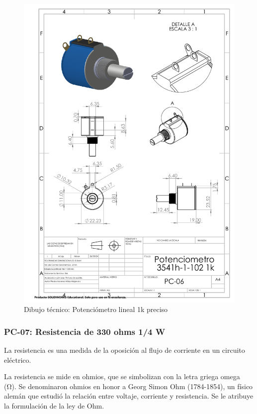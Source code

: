 \begin{figure}[H]
    \centering
    \includegraphics[trim = {7mm 1mm 1mm 1mm},clip,scale=0.4]{22/img/potenciometroDibujo.PDF}
    \caption{Dibujo técnico: Potenciómetro lineal 1k preciso}
    \label{fig:potenciometro}
\end{figure}


\subsubsection{PC-07: Resistencia de 330 ohms 1/4 W }
La resistencia es una medida de la oposición al flujo de corriente en un circuito eléctrico.

La resistencia se mide en ohmios, que se simbolizan con la letra griega omega (Ω). Se denominaron ohmios en honor a Georg Simon Ohm (1784-1854), un físico alemán que estudió la relación entre voltaje, corriente y resistencia. Se le atribuye la formulación de la ley de Ohm.

